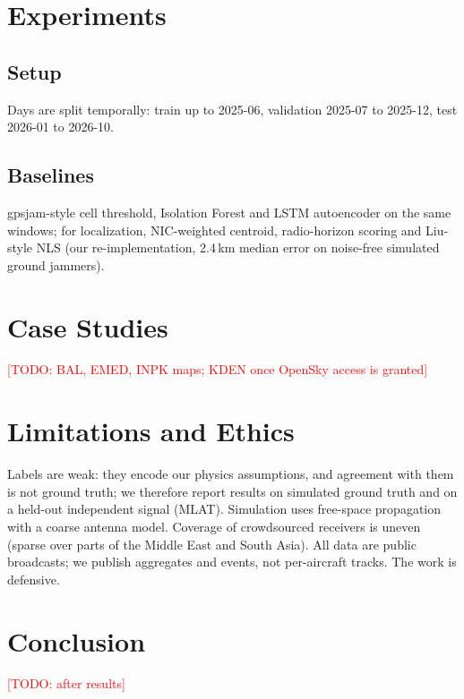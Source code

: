 \documentclass[conference]{IEEEtran}
\newcommand{\todo}[1]{\textcolor{red}{[TODO: #1]}}
\begin{document}
\section{Experiments}
\subsection{Setup}
Days are split temporally: train up to 2025-06, validation 2025-07 to 2025-12, test 2026-01 to 2026-10.
\splitsentence

\subsection{Baselines}
gpsjam-style cell threshold, Isolation Forest and LSTM autoencoder on the same windows; for localization,
NIC-weighted centroid, radio-horizon scoring and Liu-style NLS (our re-implementation, 2.4\,km median error
on noise-free simulated ground jammers).




\section{Case Studies}
\todo{BAL, EMED, INPK maps; KDEN once OpenSky access is granted}

\section{Limitations and Ethics}
Labels are weak: they encode our physics assumptions, and agreement with them is not ground truth;
we therefore report results on simulated ground truth and on a held-out independent signal (MLAT).
Simulation uses free-space propagation with a coarse antenna model. Coverage of crowdsourced receivers is
uneven (sparse over parts of the Middle East and South Asia). All data are public broadcasts; we publish
aggregates and events, not per-aircraft tracks. The work is defensive.

\section{Conclusion}
\todo{after results}



\end{document}
